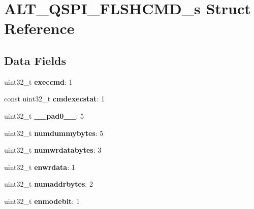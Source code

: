 \hypertarget{structALT__QSPI__FLSHCMD__s}{}\section{A\+L\+T\+\_\+\+Q\+S\+P\+I\+\_\+\+F\+L\+S\+H\+C\+M\+D\+\_\+s Struct Reference}
\label{structALT__QSPI__FLSHCMD__s}
\subsection*{Data Fields}
\begin{DoxyCompactItemize}
\item 
\mbox{\label{structALT__QSPI__FLSHCMD__s_acdf43d10fed3eaac79c2cdbac02679bc}} 
uint32\+\_\+t {\bfseries execcmd}\+: 1
\item 
\mbox{\label{structALT__QSPI__FLSHCMD__s_aff298232b04ae4b716f8764ada018a85}} 
const uint32\+\_\+t {\bfseries cmdexecstat}\+: 1
\item 
\mbox{\label{structALT__QSPI__FLSHCMD__s_a4b4bb17a88cd962b577181dbca291a7a}} 
uint32\+\_\+t {\bfseries \+\_\+\+\_\+pad0\+\_\+\+\_\+}\+: 5
\item 
\mbox{\label{structALT__QSPI__FLSHCMD__s_a09950b6dacce21ec8a9f65784064c85c}} 
uint32\+\_\+t {\bfseries numdummybytes}\+: 5
\item 
\mbox{\label{structALT__QSPI__FLSHCMD__s_a5f9a69aa2850a52b1a9edcf4fcc79ebe}} 
uint32\+\_\+t {\bfseries numwrdatabytes}\+: 3
\item 
\mbox{\label{structALT__QSPI__FLSHCMD__s_a98a51128f7ff4ca577bdfac532fd9d5c}} 
uint32\+\_\+t {\bfseries enwrdata}\+: 1
\item 
\mbox{\label{structALT__QSPI__FLSHCMD__s_a2b0f612a27c7d5948420af9972df03f7}} 
uint32\+\_\+t {\bfseries numaddrbytes}\+: 2
\item 
\mbox{\label{structALT__QSPI__FLSHCMD__s_a8d1fa7492ebd20331f35a1c2c006ba5e}} 
uint32\+\_\+t {\bfseries enmodebit}\+: 1
\item 

\end{DoxyCompactItemize}
